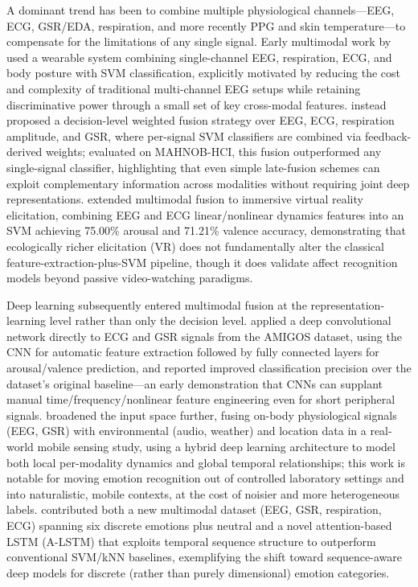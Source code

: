 A dominant trend has been to combine multiple physiological channels---EEG, ECG, GSR/EDA, respiration, and more recently PPG and skin temperature---to compensate for the limitations of any single signal. Early multimodal work by \cite{liu2018human} used a wearable system combining single-channel EEG, respiration, ECG, and body posture with SVM classification, explicitly motivated by reducing the cost and complexity of traditional multi-channel EEG setups while retaining discriminative power through a small set of key cross-modal features. \cite{wei2018emotion} instead proposed a decision-level weighted fusion strategy over EEG, ECG, respiration amplitude, and GSR, where per-signal SVM classifiers are combined via feedback-derived weights; evaluated on MAHNOB-HCI, this fusion outperformed any single-signal classifier, highlighting that even simple late-fusion schemes can exploit complementary information across modalities without requiring joint deep representations. \cite{marinmorales2018affective} extended multimodal fusion to immersive virtual reality elicitation, combining EEG and ECG linear/nonlinear dynamics features into an SVM achieving 75.00\% arousal and 71.21\% valence accuracy, demonstrating that ecologically richer elicitation (VR) does not fundamentally alter the classical feature-extraction-plus-SVM pipeline, though it does validate affect recognition models beyond passive video-watching paradigms.

Deep learning subsequently entered multimodal fusion at the representation-learning level rather than only the decision level. \cite{granados2018deep} applied a deep convolutional network directly to ECG and GSR signals from the AMIGOS dataset, using the CNN for automatic feature extraction followed by fully connected layers for arousal/valence prediction, and reported improved classification precision over the dataset's original baseline---an early demonstration that CNNs can supplant manual time/frequency/nonlinear feature engineering even for short peripheral signals. \cite{kanjo2018deep} broadened the input space further, fusing on-body physiological signals (EEG, GSR) with environmental (audio, weather) and location data in a real-world mobile sensing study, using a hybrid deep learning architecture to model both local per-modality dynamics and global temporal relationships; this work is notable for moving emotion recognition out of controlled laboratory settings and into naturalistic, mobile contexts, at the cost of noisier and more heterogeneous labels. \cite{song2019mped} contributed both a new multimodal dataset (EEG, GSR, respiration, ECG) spanning six discrete emotions plus neutral and a novel attention-based LSTM (A-LSTM) that exploits temporal sequence structure to outperform conventional SVM/kNN baselines, exemplifying the shift toward sequence-aware deep models for discrete (rather than purely dimensional) emotion categories.

